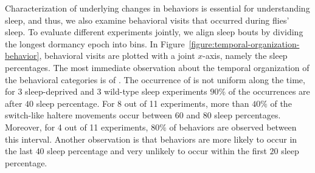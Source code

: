 Characterization of underlying changes in behaviors is essential for understanding sleep, and thus, we also examine behavioral visits that occurred during flies' sleep.
To evaluate different experiments jointly, we align sleep bouts by dividing the longest dormancy epoch into bins.
In Figure~\ref{figure:temporal-organization-behavior}, behavioral visits are plotted with a joint $x$-axis, namely the sleep percentages.
The most immediate observation about the temporal organization of the behavioral categories is of \HaltereSwitch.
The occurrence of \HaltereSwitch is not uniform along the time, for 3 sleep-deprived and 3 wild-type sleep experiments $90\%$ of the \HaltereSwitch occurrences are after $40$ sleep percentage.
For 8 out of 11 experiments, more than $40\%$ of the switch-like haltere movements occur between $60$ and $80$ sleep percentages.
Moreover, for 4 out of 11 experiments, $80\%$ of \HaltereSwitch behaviors are observed between this interval.
Another observation is that \Grooming behaviors are more likely to occur in the last $40$ sleep percentage and very unlikely to occur within the first $20$ sleep percentage.
